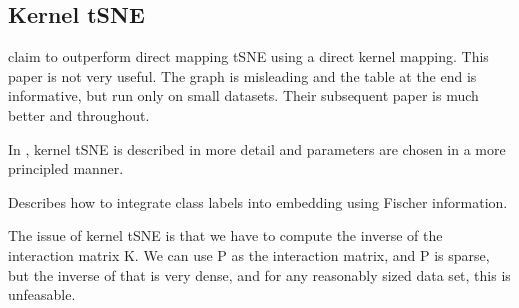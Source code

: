 \documentclass[11pt]{article}
\begin{document}
\subsection{Kernel tSNE}
\cite{gisbrecht2012out} claim to outperform direct mapping tSNE using a direct kernel mapping. This paper is not very useful. The graph is misleading and the table at the end is informative, but run only on small datasets. Their subsequent paper is much better and throughout.

In \cite{gisbrecht2015parametric}, kernel tSNE is described in more detail and parameters are chosen in a more principled manner.

Describes how to integrate class labels into embedding using Fischer information.

The issue of kernel tSNE is that we have to compute the inverse of the interaction matrix K. We can use P as the interaction matrix, and P is sparse, but the inverse of that is very dense, and for any reasonably sized data set, this is unfeasable.




\end{document}
